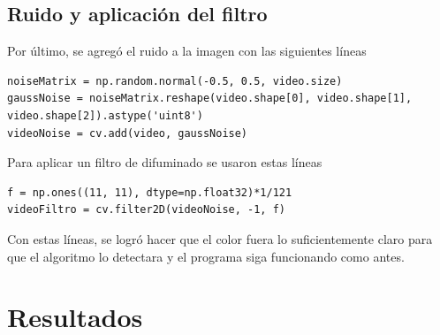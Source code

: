 \documentclass[12pt, oneside]{article}
\begin{document}
\subsection{Ruido y aplicación del filtro}
{\sffamily\large\justify
    \hspace{0.5cm} Por último, se agregó el ruido a la imagen con las siguientes líneas

    \begin{lstlisting}[style=pythonScript]
noiseMatrix = np.random.normal(-0.5, 0.5, video.size)
gaussNoise = noiseMatrix.reshape(video.shape[0], video.shape[1], video.shape[2]).astype('uint8')
videoNoise = cv.add(video, gaussNoise)
    \end{lstlisting}

    \hspace{0.5cm} Para aplicar un filtro de difuminado se usaron estas líneas

    \begin{lstlisting}[style=pythonScript]
f = np.ones((11, 11), dtype=np.float32)*1/121
videoFiltro = cv.filter2D(videoNoise, -1, f)
    \end{lstlisting}

    \hspace{0.5cm} Con estas líneas, se logró hacer que el color fuera lo
    suficientemente claro para que el algoritmo lo detectara y el programa siga
    funcionando como antes.

}

\newpage
\section{Resultados}
\end{document}
